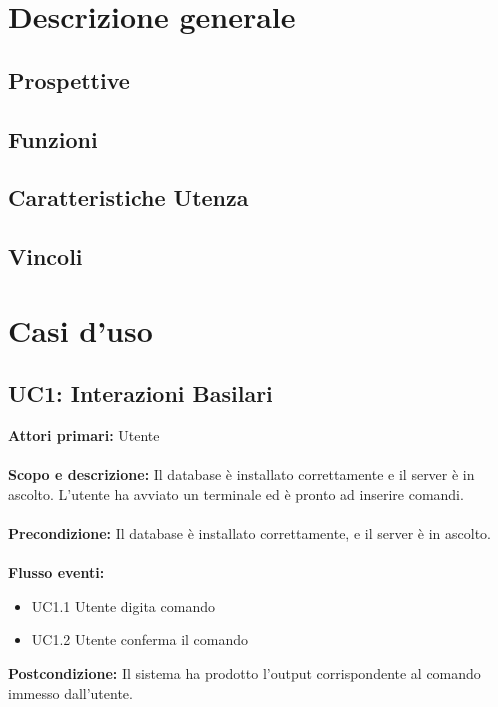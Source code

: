 \documentclass{scalatekids-article}
\begin{document}
\section{Descrizione generale}
\subsection{Prospettive}
\subsection{Funzioni}
\subsection{Caratteristiche Utenza}
\subsection{Vincoli}
\section{Casi d'uso}
\subsection{UC1: Interazioni Basilari}
\textbf{Attori primari:} Utente\\ \\
\textbf{Scopo e descrizione:} Il database è installato correttamente e il server è in ascolto.
L'utente ha avviato un terminale ed è pronto ad inserire comandi.\\ \\
\textbf{Precondizione:} Il database è installato correttamente, e il server è in ascolto.\\ \\
\textbf{Flusso eventi:}
\begin{itemize}
\item{UC1.1} Utente digita comando
\item{UC1.2} Utente conferma il comando
\end{itemize}
\textbf{Postcondizione:} Il sistema ha prodotto l'output corrispondente al comando immesso dall'utente.
\end{document}
